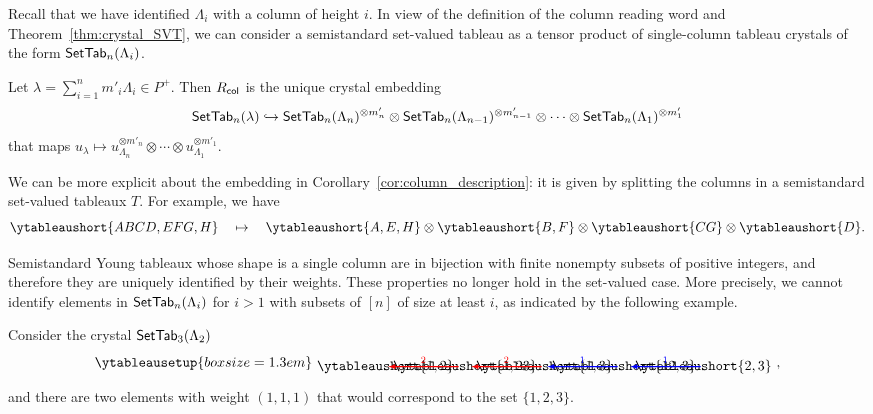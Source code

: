 \documentclass[11pt]{article}
\begin{document}
Recall that we have identified $\Lambda_i$ with a column of height $i$.
In view of the definition of the column reading word and Theorem~\ref{thm:crystal_SVT}, we can consider a semistandard set-valued tableau as a tensor product of single-column tableau crystals of the form $\mathsf{SetTab}_n(\Lambda_i)$.

\begin{corollary}
\label{cor:column_description}
Let $\lambda = \sum_{i=1}^n m'_i \Lambda_i \in P^+$.
Then $R_{\mathsf{col}}$ is the unique crystal embedding
\[
\mathsf{SetTab}_n(\lambda) \hookrightarrow \mathsf{SetTab}_n(\Lambda_n)^{\otimes m'_n} \otimes \mathsf{SetTab}_n(\Lambda_{n-1})^{\otimes m'_{n-1}} \otimes \cdots \otimes \mathsf{SetTab}_n(\Lambda_1)^{\otimes m'_1}
\]
that maps $u_{\lambda} \mapsto u_{\Lambda_n}^{\otimes m'_n} \otimes \cdots \otimes u_{\Lambda_1}^{\otimes m'_1}$.
\end{corollary}

We can be more explicit about the embedding in Corollary~\ref{cor:column_description}: it is given by splitting the columns in a semistandard set-valued tableaux $T$.
For example, we have
\[
\ytableaushort{ABCD,EFG,H}
\quad \mapsto \quad
\ytableaushort{A,E,H} \otimes \ytableaushort{B,F} \otimes \ytableaushort{CG} \otimes \ytableaushort{D}.
\]

Semistandard Young tableaux whose shape is a single column are in bijection with finite nonempty subsets of positive integers, and therefore they are uniquely identified by their weights.
These properties no longer hold in the set-valued case.
More precisely, we cannot identify elements in $\mathsf{SetTab}_n(\Lambda_i)$ for $i > 1$ with   subsets of $[n]$ of size at least $i$,  as indicated by the following example.

\begin{example}
\label{ex:column_not_subsets}
Consider the crystal $\mathsf{SetTab}_3(\Lambda_2)$
\[
\ytableausetup{boxsize=1.3em}
\begin{tikzpicture}[>=latex,xscale=2,baseline=0]
\node (12) at (0,0) {$\ytableaushort{1,2}$};
\node (13) at (2,0) {$\ytableaushort{1,3}$};
\node (23) at (4,0) {$\ytableaushort{2,3}$};
\node (123b) at (3,0) {$\ytableaushort{{12},3}$};
\node (123a) at (1,0) {$\ytableaushort{1,{23}}$};
\draw[->,thick,color=red] (12) -- node[midway,above,scale=.7] {2} (123a);
\draw[->,thick,color=red]  (123a) -- node[midway,above,scale=.7] {2} (13);
\draw[->,thick,color=blue] (13) -- node[midway,above,scale=.7] {1} (123b);
\draw[->,thick,color=blue](123b) -- node[midway,above,scale=.7] {1} (23);
\end{tikzpicture},
\]
and there are two elements with weight $(1,1,1)$ that would correspond to the set $\{1,2,3\}$.
\end{example}
\end{document}
